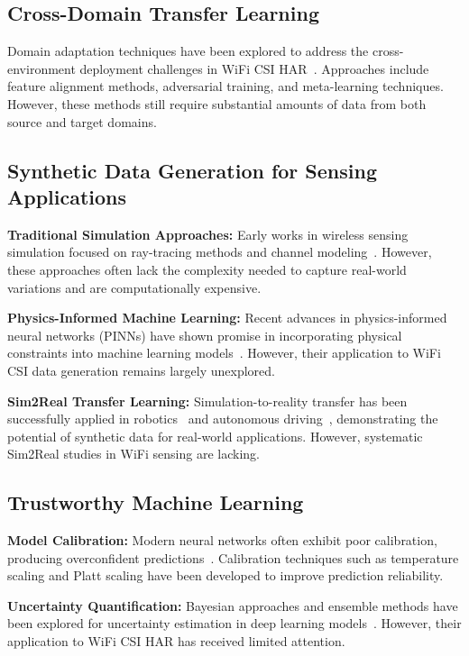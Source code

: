 \documentclass[journal]{IEEEtran}
\begin{document}
\subsection{Cross-Domain Transfer Learning}

Domain adaptation techniques have been explored to address the cross-environment deployment challenges in WiFi CSI HAR~\cite{reference6}. Approaches include feature alignment methods, adversarial training, and meta-learning techniques. However, these methods still require substantial amounts of data from both source and target domains.

\subsection{Synthetic Data Generation for Sensing Applications}

\textbf{Traditional Simulation Approaches:} Early works in wireless sensing simulation focused on ray-tracing methods and channel modeling~\cite{reference7}. However, these approaches often lack the complexity needed to capture real-world variations and are computationally expensive.

\textbf{Physics-Informed Machine Learning:} Recent advances in physics-informed neural networks (PINNs) have shown promise in incorporating physical constraints into machine learning models~\cite{reference8}. However, their application to WiFi CSI data generation remains largely unexplored.

\textbf{Sim2Real Transfer Learning:} Simulation-to-reality transfer has been successfully applied in robotics~\cite{reference9} and autonomous driving~\cite{reference10}, demonstrating the potential of synthetic data for real-world applications. However, systematic Sim2Real studies in WiFi sensing are lacking.

\subsection{Trustworthy Machine Learning}

\textbf{Model Calibration:} Modern neural networks often exhibit poor calibration, producing overconfident predictions~\cite{reference11}. Calibration techniques such as temperature scaling and Platt scaling have been developed to improve prediction reliability.

\textbf{Uncertainty Quantification:} Bayesian approaches and ensemble methods have been explored for uncertainty estimation in deep learning models~\cite{reference12}. However, their application to WiFi CSI HAR has received limited attention.
\end{document}
